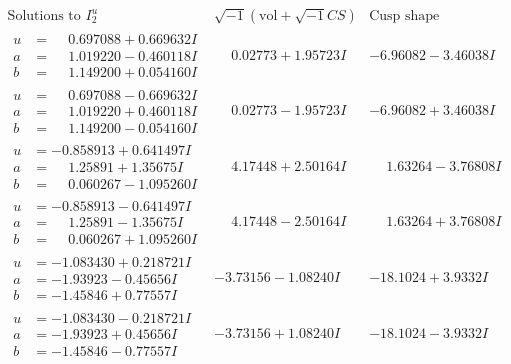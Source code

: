 \documentclass[1p]{elsarticle_modified}
\theoremstyle{definition}
\newcommand{\I}{\sqrt{-1}}
\begin{document}
$$\begin{array}{c|c|c}  
\text{Solutions to }I^u_{2}& \I (\text{vol} + \sqrt{-1}CS) & \text{Cusp shape}\\
 \hline 
\begin{aligned}
u &= \phantom{-}0.697088 + 0.669632 I \\
a &= \phantom{-}1.019220 - 0.460118 I \\
b &= \phantom{-}1.149200 + 0.054160 I\end{aligned}
 & \phantom{-}0.02773 + 1.95723 I & -6.96082 - 3.46038 I \\ \hline\begin{aligned}
u &= \phantom{-}0.697088 - 0.669632 I \\
a &= \phantom{-}1.019220 + 0.460118 I \\
b &= \phantom{-}1.149200 - 0.054160 I\end{aligned}
 & \phantom{-}0.02773 - 1.95723 I & -6.96082 + 3.46038 I \\ \hline\begin{aligned}
u &= -0.858913 + 0.641497 I \\
a &= \phantom{-}1.25891 + 1.35675 I \\
b &= \phantom{-}0.060267 - 1.095260 I\end{aligned}
 & \phantom{-}4.17448 + 2.50164 I & \phantom{-}1.63264 - 3.76808 I \\ \hline\begin{aligned}
u &= -0.858913 - 0.641497 I \\
a &= \phantom{-}1.25891 - 1.35675 I \\
b &= \phantom{-}0.060267 + 1.095260 I\end{aligned}
 & \phantom{-}4.17448 - 2.50164 I & \phantom{-}1.63264 + 3.76808 I \\ \hline\begin{aligned}
u &= -1.083430 + 0.218721 I \\
a &= -1.93923 - 0.45656 I \\
b &= -1.45846 + 0.77557 I\end{aligned}
 & -3.73156 - 1.08240 I & -18.1024 + 3.9332 I \\ \hline\begin{aligned}
u &= -1.083430 - 0.218721 I \\
a &= -1.93923 + 0.45656 I \\
b &= -1.45846 - 0.77557 I\end{aligned}
 & -3.73156 + 1.08240 I & -18.1024 - 3.9332 I \\ \hline\begin{aligned}

\end{aligned}
\end{array}$$
\end{document}
